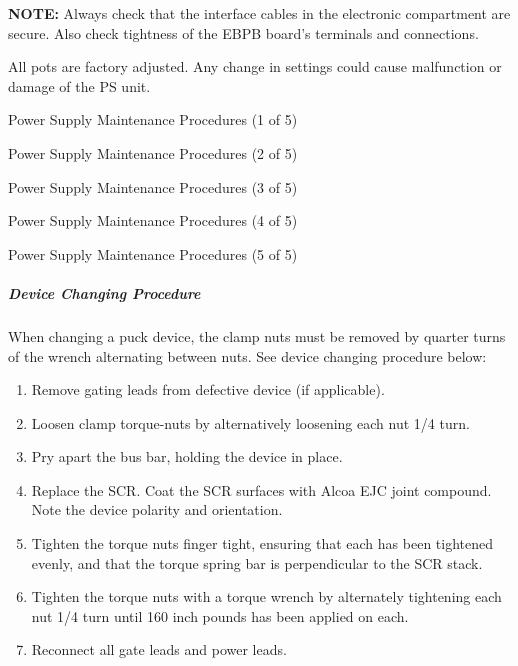 {\bf NOTE:} Always check that the interface cables in the electronic
compartment are secure.  Also check tightness of the EBPB board's
terminals and connections.

All pots are factory adjusted.  Any change in settings could
cause malfunction or damage of the PS unit.


\clearpage
\begin{table}
\caption{Power Supply Maintenance Procedures (1 of 5) \label{tab:ps_maint_1}}
\end{table}

\clearpage
\begin{table}
\caption{Power Supply Maintenance Procedures (2 of 5) \label{tab:ps_maint_2}}
\end{table}

\clearpage
\begin{table}
\caption{Power Supply Maintenance Procedures (3 of 5) \label{tab:ps_maint_3}}
\end{table}

\clearpage
\begin{table}
\caption{Power Supply Maintenance Procedures (4 of 5)} \label{tab:ps_maint_4}
\end{table}

\clearpage
\begin{table}
\caption{Power Supply Maintenance Procedures (5 of 5) \label{tab:ps_maint_5}}
\end{table}
\clearpage


\subparagraph{Device Changing Procedure}

When changing a puck device, the clamp nuts must be removed by
quarter turns of the wrench alternating between nuts.  See device
changing procedure below:

\begin{enumerate}
\item Remove gating leads from defective device (if applicable).
\item Loosen clamp torque-nuts by alternatively loosening each nut
1/4 turn.
\item Pry apart the bus bar, holding the device in place.
\item Replace the SCR.  Coat the SCR surfaces with Alcoa EJC joint
compound. Note the device polarity and orientation.
\item Tighten the torque nuts finger tight, ensuring that each has
been tightened evenly, and that the torque spring bar is perpendicular
to the SCR stack.
\item Tighten the torque nuts with a torque wrench by alternately
tightening each nut 1/4 turn until 160 inch pounds has been applied on
each.
\item Reconnect all gate leads and power leads.
\end{enumerate}


